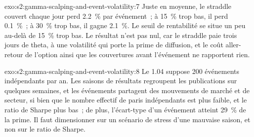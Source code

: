 \begin{solution}{exo:s2:gamma-scalping-and-event-volatility:7}
Juste en moyenne, le straddle couvert chaque jour perd 2.2~\% par événement~; à 15~\% trop bas, il perd 0.1~\%~; à 30~\% trop bas, il gagne 2.1~\%. Le seuil de rentabilité se situe un peu
au-delà de 15~\% trop bas. Le résultat n'est pas nul, car le straddle paie trois jours de theta, à une volatilité qui porte la prime de diffusion, et le coût aller-retour
de l'option ainsi que les couvertures avant l'événement ne rapportent rien.
\end{solution}

\begin{solution}{exo:s2:gamma-scalping-and-event-volatility:8}
Le 1.04 suppose 200 événements indépendants par an. Les saisons de résultats regroupent les publications sur quelques semaines, et les événements partagent des mouvements de marché et de secteur, si bien que le
nombre effectif de paris indépendants est plus faible, et le ratio de Sharpe plus bas~; de plus, l'écart-type d'un événement atteint 29~\% de la prime. Il faut dimensionner sur
un scénario de stress d'une mauvaise saison, et non sur le ratio de Sharpe.
\end{solution}

